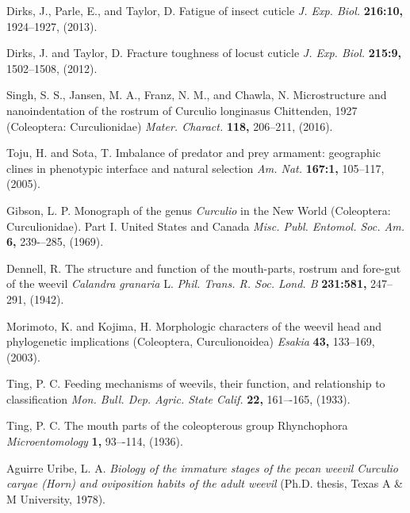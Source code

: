 \documentclass[twocolumn, linenumbers, superscriptaddress, nofootinbib]{revtex4-1}
\begin{document}
\begin{thebibliography}{50}
				Dirks, J., Parle, E., and Taylor, D.
				Fatigue of insect cuticle
				\textit{J. Exp. Biol.}
				\textbf{216:10,}
				1924--1927,
				(2013).
			
				Dirks, J. and Taylor, D.
				Fracture toughness of locust cuticle
				\textit{J. Exp. Biol.}
				\textbf{215:9,}
				1502--1508,
				(2012).
			
				Singh, S. S., Jansen, M. A., Franz, N. M., and Chawla, N.
				Microstructure and nanoindentation of the rostrum of Curculio longinasus Chittenden, 1927 (Coleoptera: Curculionidae)
				\textit{Mater. Charact.}
				\textbf{118,}
				206--211,
				(2016).
			
				Toju, H. and Sota, T.
				Imbalance of predator and prey armament: geographic clines in phenotypic interface and natural selection
				\textit{Am. Nat.}
				\textbf{167:1,}
				105--117,
				(2005).
			
				Gibson, L. P.
				Monograph of the genus \textit{Curculio} in the New World (Coleoptera: Curculionidae). Part I. United States and Canada
				\textit{Misc. Publ. Entomol. Soc. Am.}
				\textbf{6,} 
				239-–285,
				(1969).
			
				Dennell, R.
				The structure and function of the mouth-parts, rostrum and fore-gut of the weevil \textit{ Calandra granaria} L.
				\textit{Phil. Trans. R. Soc. Lond. B}
				\textbf{231:581,}
				247--291,
				(1942).
			
				Morimoto, K. and Kojima, H.
				Morphologic characters of the weevil head and phylogenetic implications (Coleoptera, Curculionoidea)
				\textit{Esakia}
				\textbf{43,}
				133--169,
				(2003).
			
				Ting, P. C.
				Feeding mechanisms of weevils, their function, and relationship to classification
				\textit{Mon. Bull. Dep. Agric. State Calif.}
				\textbf{22,}
				161–-165,
				(1933).
			
				Ting, P. C.
				The mouth parts of the coleopterous group Rhynchophora
				\textit{Microentomology}
				\textbf{1,}
				93–-114,
				(1936).
			
				Aguirre Uribe, L. A.
				\textit{Biology of the immature stages of the pecan weevil \textnormal{Curculio caryae} (Horn) and oviposition habits of the adult weevil}
				(Ph.D. thesis,
				Texas A \& M University,
				1978).
			

\end{thebibliography}
\end{document}
